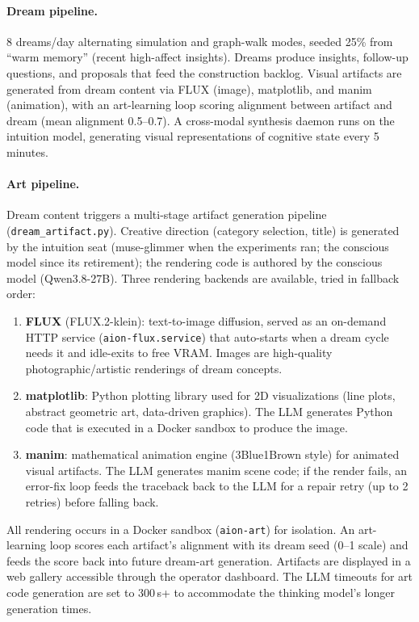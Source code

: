 \documentclass[11pt,a4paper]{article}
\begin{document}
\paragraph{Dream pipeline.} 8 dreams/day alternating simulation and graph-walk modes, seeded 25\% from ``warm memory'' (recent high-affect insights). Dreams produce insights, follow-up questions, and proposals that feed the construction backlog. Visual artifacts are generated from dream content via FLUX (image), matplotlib, and manim (animation), with an art-learning loop scoring alignment between artifact and dream (mean alignment 0.5--0.7). A cross-modal synthesis daemon runs on the intuition model, generating visual representations of cognitive state every 5 minutes.

\paragraph{Art pipeline.}\label{sec:art} Dream content triggers a multi-stage artifact generation pipeline (\texttt{dream\_artifact.py}). Creative direction (category selection, title) is generated by the intuition seat (muse-glimmer when the experiments ran; the conscious model since its retirement); the rendering code is authored by the conscious model (Qwen3.8-27B). Three rendering backends are available, tried in fallback order:
\begin{enumerate}[leftmargin=*,itemsep=0pt]
\item \textbf{FLUX} (FLUX.2-klein): text-to-image diffusion, served as an on-demand HTTP service (\texttt{aion-flux.service}) that auto-starts when a dream cycle needs it and idle-exits to free VRAM. Images are high-quality photographic/artistic renderings of dream concepts.
\item \textbf{matplotlib}: Python plotting library used for 2D visualizations (line plots, abstract geometric art, data-driven graphics). The LLM generates Python code that is executed in a Docker sandbox to produce the image.
\item \textbf{manim}: mathematical animation engine (3Blue1Brown style) for animated visual artifacts. The LLM generates manim scene code; if the render fails, an error-fix loop feeds the traceback back to the LLM for a repair retry (up to 2 retries) before falling back.
\end{enumerate}
All rendering occurs in a Docker sandbox (\texttt{aion-art}) for isolation. An art-learning loop scores each artifact's alignment with its dream seed (0--1 scale) and feeds the score back into future dream-art generation. Artifacts are displayed in a web gallery accessible through the operator dashboard. The LLM timeouts for art code generation are set to 300\,s+ to accommodate the thinking model's longer generation times.
\end{document}
